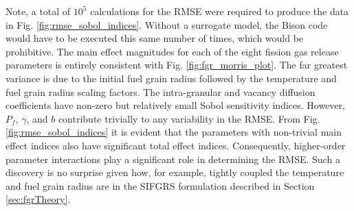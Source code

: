 Note, a total of $10^5$ calculations for the \ac{RMSE} were required to produce the data in Fig. \ref{fig:rmse_sobol_indices}. Without a surrogate model, the Bison code would have to be executed this same number of times, which would be prohibitive. The main effect magnitudes for each of the eight fission gas release parameters is entirely consistent with Fig. \ref{fig:fgr_morris_plot}. The far greatest variance is due to the initial fuel grain radius followed by the temperature and fuel grain radius scaling factors. The intra-granular and vacancy diffusion coefficients have non-zero but relatively small Sobol sensitivity indices. However, $P_f$, $\gamma$, and $b$ contribute trivially to any variability in the \ac{RMSE}. From Fig. \ref{fig:rmse_sobol_indices} it is evident that the parameters with non-trivial main effect indices also have significant total effect indices. Consequently, higher-order parameter interactions play a significant role in determining the \ac{RMSE}. Such a discovery is no surprise given how, for example, tightly coupled the temperature and fuel grain radius are in the \ac{SIFGRS} formulation described in Section \ref{sec:fgrTheory}.


